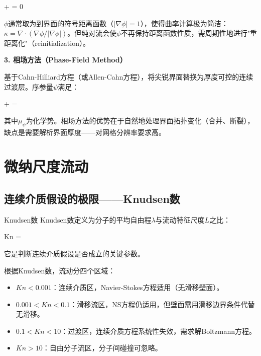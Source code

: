 \begin{myformula}
 + \cdot\nabla\phi = 0
\end{myformula}

$\phi$通常取为到界面的符号距离函数（$|\nabla\phi|=1$），使得曲率计算极为简洁：$\kappa = \nabla\cdot(\nabla\phi/|\nabla\phi|)$。但纯对流会使$\phi$不再保持距离函数性质，需周期性地进行"重距离化"（reinitialization）。

\noindent\textbf{3. 相场方法（Phase-Field Method）}

基于Cahn-Hilliard方程（或Allen-Cahn方程），将尖锐界面替换为厚度可控的连续过渡层。序参量$\psi$满足：

\begin{myformula}
 + \cdot\nabla\psi = \nabla{}
\end{myformula}

其中$\mu_{\psi}$为化学势。相场方法的优势在于自然地处理界面拓扑变化（合并、断裂），缺点是需要解析界面厚度——对网格分辨率要求高。

\section{微纳尺度流动}

\subsection{连续介质假设的极限——Knudsen数}

\begin{mydefinition}{Knudsen数}
Knudsen数定义为分子的平均自由程$\lambda$与流动特征尺度$L$之比：
\begin{myformula}
Kn = 
\end{myformula}
它是判断连续介质假设是否成立的关键参数。
\end{mydefinition}

根据Knudsen数，流动分四个区域：
\begin{itemize}
  \item $Kn < 0.001$：连续介质区，Navier-Stokes方程适用（无滑移壁面）。
  \item $0.001 < Kn < 0.1$：滑移流区，NS方程仍适用，但壁面需用滑移边界条件代替无滑移。
  \item $0.1 < Kn < 10$：过渡区，连续介质方程系统性失效，需求解Boltzmann方程。
  \item $Kn > 10$：自由分子流区，分子间碰撞可忽略。
\end{itemize}

